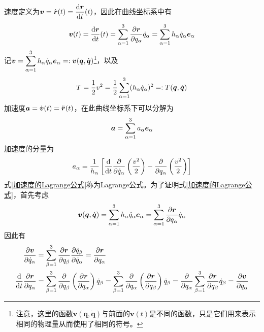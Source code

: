 速度定义为$\boldsymbol{v} = \dot{\boldsymbol{r}}(t) = \dfrac{\mathrm{d} \boldsymbol{r}}{\mathrm{d} t}(t)$，因此在曲线坐标系中有
\begin{equation}
	\boldsymbol{v}(t) = \frac{\mathrm{d} \boldsymbol{r}}{\mathrm{d} t}(t) = \sum_{\alpha=1}^3 \frac{\partial \boldsymbol{r}}{\partial q_\alpha} \dot{q}_\alpha = \sum_{\alpha=1}^3 h_\alpha \dot{q}_\alpha \boldsymbol{e}_\alpha
\end{equation}
记$\displaystyle \boldsymbol{v} = \sum_{\alpha=1}^3 h_\alpha \dot{q}_\alpha \boldsymbol{e}_\alpha =: \boldsymbol{v}(\boldsymbol{q},\dot{\boldsymbol{q}})$\footnote{注意，这里的函数$\boldsymbol{v}(\boldsymbol{q},\dot{\boldsymbol{q}})$与前面的$\boldsymbol{v}(t)$是不同的函数，只是它们用来表示相同的物理量从而使用了相同的符号。}，以及
\begin{equation}
	T = \frac12 v^2 = \frac12 \sum_{\alpha=1}^3 (h_\alpha \dot{q}_\alpha)^2 =: T (\boldsymbol{q},\dot{\boldsymbol{q}})
\end{equation}
加速度$\boldsymbol{a} = \dot{\boldsymbol{v}}(t) = \ddot{\boldsymbol{r}}(t)$，在此曲线坐标系下可以分解为
\begin{equation*}
	\boldsymbol{a} = \sum_{\alpha=1}^3 a_\alpha \boldsymbol{e}_\alpha
\end{equation*}
加速度的分量为
\begin{equation}
	a_\alpha = \frac{1}{h_\alpha} \left[\frac{\mathrm{d}}{\mathrm{d} t} \frac{\partial}{\partial \dot{q}_\alpha} \left(\frac{v^2}{2}\right) - \frac{\partial}{\partial q_\alpha} \left(\frac{v^2}{2}\right)\right]
	\label{加速度的Lagrange公式}
\end{equation}
式\eqref{加速度的Lagrange公式}称为{\heiti Lagrange公式}。为了证明式\eqref{加速度的Lagrange公式}，首先考虑
\begin{equation}
	\boldsymbol{v}(\boldsymbol{q},\dot{\boldsymbol{q}}) = \sum_{\alpha=1}^3 h_\alpha \dot{q}_\alpha \boldsymbol{e}_\alpha = \sum_{\alpha=1}^3 \frac{\partial \boldsymbol{r}}{\partial q_\alpha} \dot{q}_\alpha
\end{equation}
因此有
\begin{align}
	\frac{\partial \boldsymbol{v}}{\partial \dot{q}_\alpha} & = \sum_{\beta=1}^3 \frac{\partial \boldsymbol{r}}{\partial q_\beta} \frac{\partial \dot{q}_\beta}{\partial \dot{q}_\alpha} = \frac{\partial \boldsymbol{r}}{\partial q_\alpha} \label{Lagrange公式中间步骤1} \\
	\frac{\mathrm{d}}{\mathrm{d} t} \frac{\partial \boldsymbol{r}}{\partial q_\alpha} & = \sum_{\beta=1}^3 \frac{\partial}{\partial q_\beta} \left(\frac{\partial \boldsymbol{r}}{\partial q_\alpha}\right) \dot{q}_\beta = \sum_{\beta=1}^3 \frac{\partial}{\partial q_\alpha} \left(\frac{\partial \boldsymbol{r}}{\partial q_\beta}\right) \dot{q}_\beta = \frac{\partial}{\partial q_\alpha} \sum_{\beta=1}^3 \frac{\partial \boldsymbol{r}}{\partial q_\beta} \dot{q}_\beta = \frac{\partial \boldsymbol{v}}{\partial q_\alpha}
	\label{Lagrange公式中间步骤2}
\end{align}
